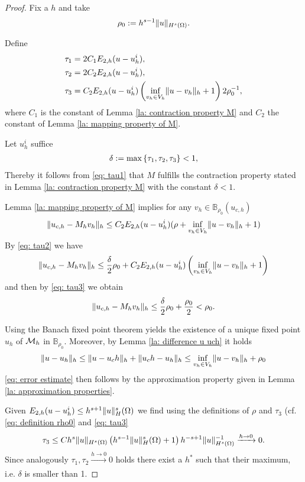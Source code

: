 \begin{proof}
	Fix a $h$ and take
	\begin{align}
		\rho_0:= h^{s-1} \lVert u \rVert_{H^{s}(\Omega)}. \label{eq: definition rho0}
	\end{align}
	
	Define 
	\begin{align}
		\tau_1 &= 2 C_1 E_{2,h}(u-u_h^i), \label{eq: tau1}\\
		\tau_2 & = 2 C_2 E_{2,h}(u-u_h^i), \label{eq: tau2}\\
		\tau_3 & = C_2 E_{2,h}(u-u_h^i) \left(\inf_{v_h \in V_h} \lVert u-v_h \rVert_{h}+1\right) 2 \rho_0^{-1} \label{eq: tau3},
	\end{align}
	where $C_1$ is the constant of Lemma \ref{la: contraction property M} and $C_2$ the constant of Lemma \ref{la: mapping property of M}. 
	
	Let $u_h^i$ suffice
	\begin{align}
		\delta := \operatorname{max} \left\{ \tau_1, \tau_2, \tau_3 \right\} < 1,
	\end{align}
	Thereby it follows from \eqref{eq: tau1} that $M$ fulfills the contraction property stated in Lemma \ref{la: contraction property M} with the constant $\delta<1$.
	
	Lemma \ref{la: mapping property of M} implies for any $v_h \in \mathbb{B}_{\rho_0}(u_{c,h})$
	 \[
	 	\lVert u_{c,h} - M_h v_h \rVert_{h} \leq 
	 		C_2 E_{2,h}(u - u^i_h) (\rho+ \inf_{v_h \in V_h} \lVert u-v_h \rVert_{h}+1) 
	 \]
	By \eqref{eq: tau2} we have 
	 \[
	 	\lVert u_{c,h} - M_h v_h \rVert_{h} \leq 
	 		\frac \delta 2 \rho_0 
	 			+ C_2  E_{2,h}(u - u^i_h) \left( \inf_{v_h \in V_h} \lVert u-v_h \rVert_{h}+1\right)
	 \]
	 and then by \eqref{eq: tau3} we obtain
	 \[
	 	\lVert u_{c,h} - M_h v_h \rVert_{h} \leq 
	 		\frac \delta 2 \rho_0 
	 		+ \frac {\rho_0} 2  < \rho_0.
	 \]
	 			 	  		 
	 Using the Banach fixed point theorem yields the existence of a unique fixed point $u_h$ of $\mathcal M_h$ in $\mathbb B_{\rho_0}$.
	 Moreover, by Lemma \ref{la: difference u uch} it holds
	 \begin{align}
	 	\lVert u-u_h \rVert_{h} \leq \lVert u-u_ch \rVert_{h} + \lVert u_ch - u_h \rVert_{h} \leq \inf_{v_h \in V_h} \lVert u-v_h \rVert_{h} +\rho_0 
	\end{align}
	\eqref{eq: error estimate} then follows by the approximation property given in Lemma \ref{la: approximation properties}.
	
	Given $E_{2,h}(u-u_h^i) \leq h^{s+1} \lVert u \rVert_H^s(\Omega)$ we find using the definitions of $\rho$ and $\tau_3$ (cf. \eqref{eq: definition rho0} and \eqref{eq: tau3}
	\begin{align*}
		\tau_3  \leq C h^{s} \lVert u \rVert_{H^s(\Omega)} \left(h^{s-1} \lVert u \rVert_H^s(\Omega)+1\right) h^{-s+1} \lVert u \rVert_{H^{s}(\Omega)}^{-1} \xrightarrow{h \rightarrow 0}  0.
	\end{align*}
	Since analogously $\tau_1, \tau_2 \xrightarrow[]{h\rightarrow 0} 0$ holds there exist a $h^*$ such that their maximum, i.e. $\delta$ is smaller than 1.
\end{proof}
